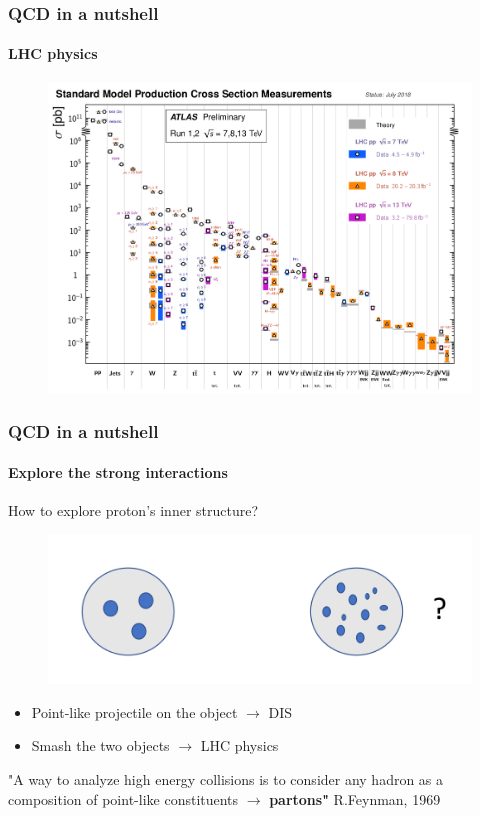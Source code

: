 \documentclass[aspectratio=43]{beamer}
\begin{document}
\begin{frame}
	
	\frametitle{QCD in a nutshell}
	\framesubtitle{LHC physics}
	
	\begin{figure}
		\includegraphics[width = 9.5 cm]{plots/lhc_measurements.png}
	\end{figure}

\end{frame}

\begin{frame}

	\frametitle{QCD in a nutshell}
	\framesubtitle{Explore the strong interactions}
	
	How to explore proton's inner structure?
	
	\begin{figure}
		\includegraphics[width = 0.5\linewidth]{plots/protons.png}
	\end{figure}
	
	
	\begin{itemize}
		\item Point-like projectile on the object $\longrightarrow$ DIS
		\item Smash the two objects $\longrightarrow$ LHC physics
	\end{itemize}
	
	{\color{blue}"A way to analyze high energy collisions is to consider any hadron as a composition of point-like constituents $\longrightarrow$ \textbf{partons"} } R.Feynman, 1969 

\end{frame}
\end{document}
